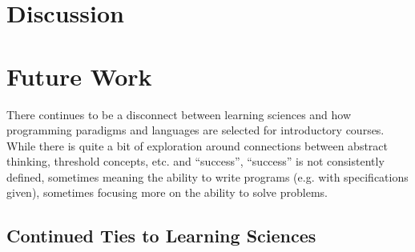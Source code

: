 \documentclass[12pt]{article}
\let\textcite=\autocite
\begin{document}


\section{Discussion}

\section{Future Work}

There continues to be a disconnect between learning sciences and how
programming paradigms and languages are selected for introductory
courses. While there is quite a bit of exploration around connections
between abstract thinking, threshold concepts, etc. and ``success'',
“success” is not consistently defined, sometimes meaning the ability
to write programs (e.g. with specifications given), sometimes focusing
more on the ability to solve problems.

\subsection{Continued Ties to Learning Sciences}
\end{document}
